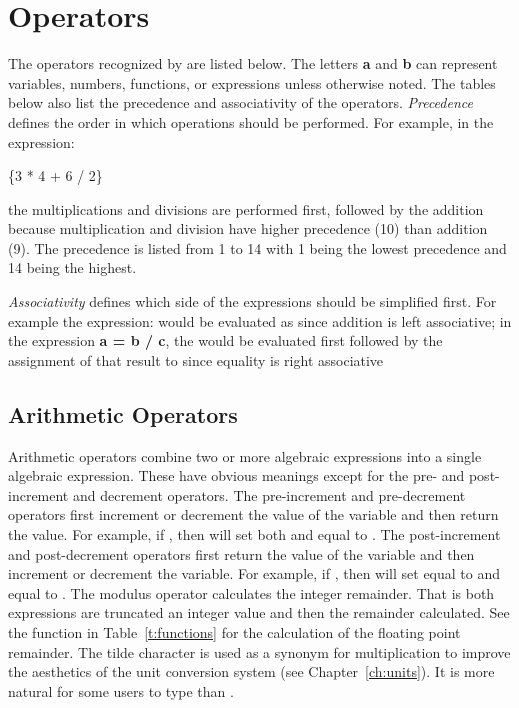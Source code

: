 \chapter{Operators}\label{ch:operators}

The operators recognized by \aprepro{} are listed below. The letters \textbf{a}
and \textbf{b} can represent variables, numbers, functions, or expressions unless
otherwise noted. The tables below also list the precedence and associativity of
the operators. {\em Precedence} defines the order in which operations should be performed.
For example, in the expression:
\begin{apinp}
\{3 * 4 + 6 / 2\}
\end{apinp}
the multiplications and divisions are performed first, followed by the addition
because multiplication and division have higher precedence (10) than addition (9). The precedence
is listed from 1 to 14 with 1 being the lowest precedence and 14 being the highest.

{\em Associativity} defines which side of the expressions should be
simplified first.  For example the expression:  would
be evaluated as  since addition is left associative;
in the expression \textbf{a = b / c}, the  would be evaluated
first followed by the assignment of that result to  since
equality is right associative

\section{Arithmetic Operators}

Arithmetic operators combine two or more algebraic expressions into a
single algebraic expression. These have obvious meanings except for
the pre- and post- increment and decrement operators. The
pre-increment and pre-decrement operators first increment or decrement
the value of the variable and then return the value. For example, if
, then  will set both  and  equal to . The post-increment and
post-decrement operators first return the value of the
variable and then increment or decrement the variable. For example, if
, then  will set
 equal to  and  equal to . The
modulus operator \cmd{\%} calculates the integer remainder. That is
both expressions are truncated an integer value and then the remainder
calculated. See the  function in Table~\ref{t:functions} for
the calculation of the floating point remainder. The tilde character
\cmd{\textasciitilde{}} is used as a synonym for multiplication to
improve the aesthetics of the unit conversion system (see
Chapter~\ref{ch:units}). It is more natural for some users to type
 than .


